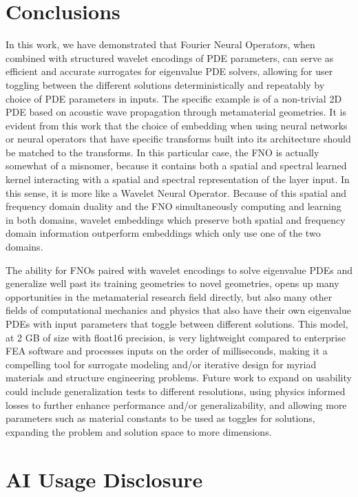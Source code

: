 \documentclass[preprint,review,12pt]{elsarticle}
\begin{document}
\section{Conclusions}
\label{sec:Conclusion}
In this work, we have demonstrated that Fourier Neural Operators, when combined with structured wavelet encodings of PDE parameters, can serve as efficient and accurate surrogates for eigenvalue PDE solvers, allowing for user toggling between the different solutions deterministically and repeatably by choice of PDE parameters in inputs. The specific example is of a non-trivial 2D PDE based on acoustic wave propagation through metamaterial geometries. It is evident from this work that the choice of embedding when using neural networks or neural operators that have specific transforms built into its architecture should be matched to the transforms. In this particular case, the FNO is actually somewhat of a misnomer, because it contains both a spatial and spectral learned kernel interacting with a spatial and spectral representation of the layer input. In this sense, it is more like a Wavelet Neural Operator. Because of this spatial and frequency domain duality and the FNO simultaneously computing and learning in both domains, wavelet embeddings which preserve both spatial and frequency domain information outperform embeddings which only use one of the two domains.

The ability for FNOs paired with wavelet encodings to solve eigenvalue PDEs and generalize well past its training geometries to novel geometries, opens up many opportunities in the metamaterial research field directly, but also many other fields of computational mechanics and physics that also have their own eigenvalue PDEs with input parameters that toggle between different solutions. This model, at 2 GB of size with float16 precision, is very lightweight compared to enterprise FEA software and processes inputs on the order of milliseconds, making it a compelling tool for surrogate modeling and/or iterative design for myriad materials and structure engineering problems. Future work to expand on usability could include generalization tests to different resolutions, using physics informed losses to further enhance performance and/or generalizability, and allowing more parameters such as material constants to be used as toggles for solutions, expanding the problem and solution space to more dimensions.

\section*{AI Usage Disclosure}
\end{document}
